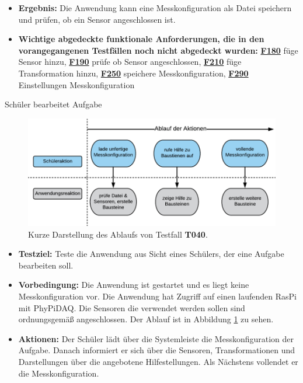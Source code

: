 \documentclass[parskip=full]{scrartcl}
\begin{document}
\begin{description}
\begin{itemize}
\item []\textbf{Ergebnis:} Die Anwendung kann eine Messkonfiguration als Datei speichern und prüfen, ob ein Sensor angeschlossen ist.
\item []\textbf{Wichtige abgedeckte funktionale Anforderungen, die in den vorangegangenen Testfällen noch nicht abgedeckt wurden:} \hyperlink{link-f180}{\textbf{F180}} füge Sensor hinzu, \hyperlink{link-f190}{\textbf{F190}} prüfe ob Sensor angeschlossen, \hyperlink{link-f210}{\textbf{F210}} füge Transformation hinzu, \hyperlink{link-f250}{\textbf{F250}} speichere Messkonfiguration, \hyperlink{link-f290}{\textbf{F290}} Einstellungen Messkonfiguration 

\end{itemize}

\hypertarget{link-t040}{\item[T040]} Schüler bearbeitet Aufgabe

\begin{figure}[htbp]
	\begin{center}
		\includegraphics[width = 13cm]{Grafik/T040-Ablauf.png}
		\caption{Kurze Darstellung des Ablaufs von Testfall \textbf{T040}.}
		\label{T040-Ablauf}
	\end{center}
\end{figure}
\begin{itemize}

\item []\textbf{Testziel:} Teste die Anwendung aus Sicht eines Schülers, der eine Aufgabe bearbeiten soll.

\item []\textbf{Vorbedingung:} Die Anwendung ist gestartet und es liegt keine Messkonfiguration vor. Die Anwendung hat Zugriff auf einen laufenden \gls{RasPi} mit \gls{PhyPiDAQ}. Die Sensoren die verwendet werden sollen sind ordnungsgemäß angeschlossen. Der Ablauf ist in Abbildung \ref{T040-Ablauf} zu sehen.

\item []\textbf{Aktionen:} Der Schüler lädt über die Systemleiste die Messkonfiguration der Aufgabe. Danach informiert er sich über die Sensoren, Transformationen und Darstellungen über die angebotene Hilfestellungen. Als Nächstens vollendet er die Messkonfiguration.
 

\end{itemize}
\end{description}
\end{document}

